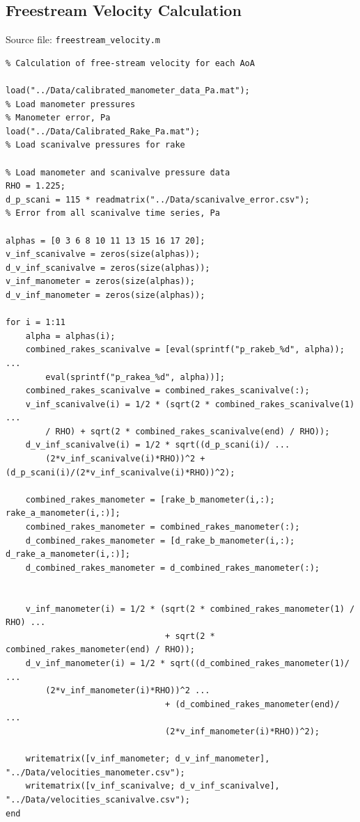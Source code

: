 \documentclass[runningheads]{llncs}
\begin{document}
\subsection{Freestream Velocity Calculation}

Source file: \verb|freestream_velocity.m|

\begin{verbatim}
% Calculation of free-stream velocity for each AoA

load("../Data/calibrated_manometer_data_Pa.mat");
% Load manometer pressures
% Manometer error, Pa
load("../Data/Calibrated_Rake_Pa.mat");
% Load scanivalve pressures for rake

% Load manometer and scanivalve pressure data
RHO = 1.225;
d_p_scani = 115 * readmatrix("../Data/scanivalve_error.csv");
% Error from all scanivalve time series, Pa

alphas = [0 3 6 8 10 11 13 15 16 17 20];
v_inf_scanivalve = zeros(size(alphas));
d_v_inf_scanivalve = zeros(size(alphas));
v_inf_manometer = zeros(size(alphas));
d_v_inf_manometer = zeros(size(alphas));

for i = 1:11
    alpha = alphas(i);
    combined_rakes_scanivalve = [eval(sprintf("p_rakeb_%d", alpha)); ...
        eval(sprintf("p_rakea_%d", alpha))];
    combined_rakes_scanivalve = combined_rakes_scanivalve(:);
    v_inf_scanivalve(i) = 1/2 * (sqrt(2 * combined_rakes_scanivalve(1) ...
        / RHO) + sqrt(2 * combined_rakes_scanivalve(end) / RHO));
    d_v_inf_scanivalve(i) = 1/2 * sqrt((d_p_scani(i)/ ...
        (2*v_inf_scanivalve(i)*RHO))^2 + (d_p_scani(i)/(2*v_inf_scanivalve(i)*RHO))^2);
    
    combined_rakes_manometer = [rake_b_manometer(i,:); rake_a_manometer(i,:)];
    combined_rakes_manometer = combined_rakes_manometer(:);
    d_combined_rakes_manometer = [d_rake_b_manometer(i,:); d_rake_a_manometer(i,:)];
    d_combined_rakes_manometer = d_combined_rakes_manometer(:);
    
    
    v_inf_manometer(i) = 1/2 * (sqrt(2 * combined_rakes_manometer(1) / RHO) ...
                                + sqrt(2 * combined_rakes_manometer(end) / RHO));
    d_v_inf_manometer(i) = 1/2 * sqrt((d_combined_rakes_manometer(1)/ ...
        (2*v_inf_manometer(i)*RHO))^2 ...
                                + (d_combined_rakes_manometer(end)/ ...
                                (2*v_inf_manometer(i)*RHO))^2);
    
    writematrix([v_inf_manometer; d_v_inf_manometer], "../Data/velocities_manometer.csv");
    writematrix([v_inf_scanivalve; d_v_inf_scanivalve], "../Data/velocities_scanivalve.csv");
end
\end{verbatim}
\end{document}
